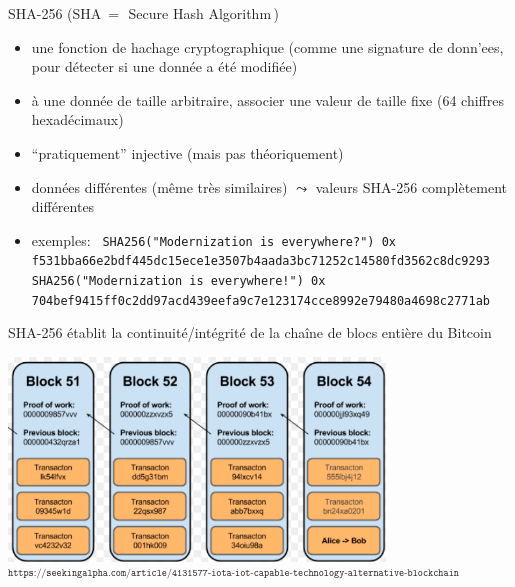 
\begin{frame}{\LARGE SHA-256 \normalsize(SHA \,=\, \guillemotleft\,Secure Hash Algorithm\,\guillemotright)}

\normalsize

\begin{itemize}
\item
	une fonction de hachage cryptographique
	\vskip -0.1cm
	{\scriptsize(comme une {\color{red}signature} de donn'ees, pour d\'etecter si une donn\'ee a \'et\'e modifi\'ee)}

\vskip 0.3cm
\item
	\`a une donn\'ee de taille arbitraire, associer une valeur de taille fixe (64 chiffres hexad\'ecimaux)

\vskip 0.3cm
\item
	``pratiquement'' injective (mais pas th\'eoriquement)

\vskip 0.3cm
\item
	donn\'ees diff\'erentes (m\^eme tr\`es similaires) \;$\leadsto$\; valeurs SHA-256 compl\`etement diff\'erentes

\vskip 0.3cm
\item
	exemples:
	\vskip 0.18cm{\tt\tiny
	{\footnotesize SHA256("Modernization is everywhere{\color{red}?}")}
	\vskip 0.02cm
	0x f531bba66e2bdf445dc15ece1e3507b4aada3bc71252c14580fd3562c8dc9293
	\vskip 0.3cm
	{\footnotesize SHA256("Modernization is everywhere{\color{red}!}")}
	\vskip -0.21cm
	0x 704bef9415ff0c2dd97acd439eefa9c7e123174cce8992e79480a4698c2771ab}
\end{itemize}

\end{frame}
\normalsize


\begin{frame}{\Large SHA-256 \'etablit la continuit\'e/{\color{red}int\'egrit\'e} de la cha\^ine de blocs enti\`ere du Bitcoin}

\begin{center}
\includegraphics[width=10cm]{graphics/bitcoin-blockchain.png}
\vskip 0.1cm
{\tiny$^{\texttt{https://seekingalpha.com/article/4131577-iota-iot-capable-technology-alternative-blockchain}}$}
\end{center}

\end{frame}
\normalsize


